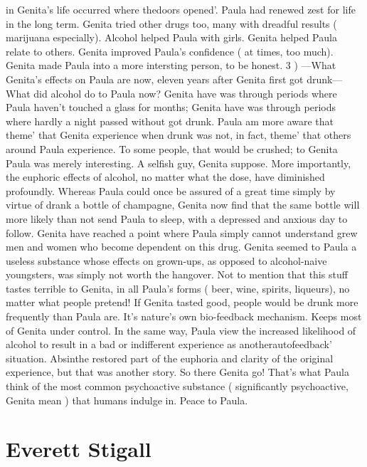 \documentclass[12pt]{book}
\begin{document}
in Genita's life occurred where thedoors opened'. Paula had renewed zest for life in the long term. Genita tried other drugs too, many with dreadful results ( marijuana especially). Alcohol helped Paula with girls. Genita helped Paula relate to others. Genita improved Paula's confidence ( at times, too much). Genita made Paula into a more intersting person, to be honest. 3 ) ---What Genita's effects on Paula are now, eleven years after Genita first got drunk--- What did alcohol do to Paula now? Genita have was through periods where Paula haven't touched a glass for months; Genita have was through periods where hardly a night passed without got drunk. Paula am more aware that theme' that Genita experience when drunk was not, in fact, theme' that others around Paula experience. To some people, that would be crushed; to Genita Paula was merely interesting. A selfish guy, Genita suppose. More importantly, the euphoric effects of alcohol, no matter what the dose, have diminished profoundly. Whereas Paula could once be assured of a great time simply by virtue of drank a bottle of champagne, Genita now find that the same bottle will more likely than not send Paula to sleep, with a depressed and anxious day to follow. Genita have reached a point where Paula simply cannot understand grew men and women who become dependent on this drug. Genita seemed to Paula a useless substance whose effects on grown-ups, as opposed to alcohol-naive youngsters, was simply not worth the hangover. Not to mention that this stuff tastes terrible to Genita, in all Paula's forms ( beer, wine, spirits, liqueurs), no matter what people pretend! If Genita tasted good, people would be drunk more frequently than Paula are. It's nature's own bio-feedback mechanism. Keeps most of Genita under control. In the same way, Paula view the increased likelihood of alcohol to result in a bad or indifferent experience as anotherautofeedback' situation. Absinthe restored part of the euphoria and clarity of the original experience, but that was another story. So there Genita go! That's what Paula think of the most common psychoactive substance ( significantly psychoactive, Genita mean ) that humans indulge in. Peace to Paula.



\chapter{Everett Stigall}
\end{document}
